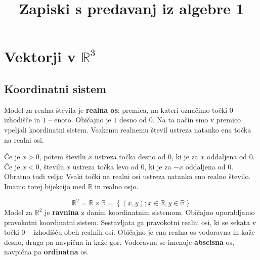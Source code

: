 \documentclass[12pt]{article}
\title{Zapiski s predavanj iz algebre 1}
\begin{document}
\maketitle

\section{Vektorji v \(\mathbb{R}^3\)}
\subsection{Koordinatni sistem}
    Model za realna števila je \textbf{realna os}: premica, na kateri označimo točki \(0\) -- izhodišče in \(1\) -- enoto.
    Običajno je \(1\) desno od \(0\). Na ta način smo v premico vpeljali koordinatni sistem. Vsakemu realnemu števil
    ustreza natanko ena točka na realni osi.

    Če je \(x > 0\), potem številu \(x\) ustreza točka desno od \(0\), ki je za \(x\) oddaljena od \(0\). Če je 
    \(x < 0\), številu \(x\) ustreza točka levo od \(0\), ki je za \(-x\) oddaljena od \(0\).
    Obratno tudi velja: Vsaki točki na realni osi ustreza natanko eno realno število.
    Imamo torej bijekcijo med \(\mathbb{R}\) in realno osjo.

    \[\mathbb{R}^2 = \mathbb{R} \times \mathbb{R} = \left\{\left(x, y\right); x \in \mathbb{R}, y \in \mathbb{R}\right\}\]
    Model za \(\mathbb{R}^2\) je \textbf{ravnina} z danim koordinatnim sistemom. Običajno uporabljamo pravokotni koordinatni sistem.
    Sestavljata ga pravokotni realni osi, ki se sekata v točki \(0\) -- izhodišču obeh realnih osi. Običajno je ena realna
    os vodoravna in kaže desno, druga pa navpična in kaže gor. Vodoravna se imenuje \textbf{abscisna} os, navpična pa
    \textbf{ordinatna} os.
\end{document}
